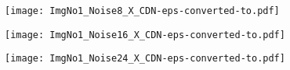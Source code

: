 \documentclass{article}
\begin{document}
\begin{figure*}[th]
\begin{multicols}{2}
		\begin{minipage}[b]{0.1\linewidth}
		\end{minipage} 
		\begin{minipage}[b]{0.28\linewidth}
			\centering
			\texttt{[image: ImgNo1\_Noise8\_X\_CDN-eps-converted-to.pdf]}
		\end{minipage} 
		\begin{minipage}[b]{0.28\linewidth}
			\centering
			\texttt{[image: ImgNo1\_Noise16\_X\_CDN-eps-converted-to.pdf]}
		\end{minipage} 
		\begin{minipage}[b]{0.28\linewidth}
			\centering
			\texttt{[image: ImgNo1\_Noise24\_X\_CDN-eps-converted-to.pdf]}
		\end{minipage} 
		\\

\end{multicols}
\end{figure*}
\end{document}
